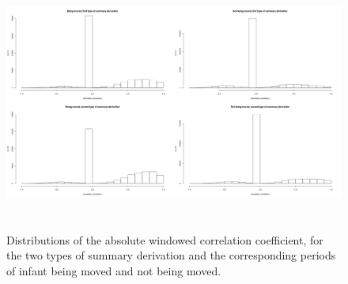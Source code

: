 \documentclass{article}
\begin{document}
{\begin{figure}[h!]
\includegraphics[width=15cm, height=8.5cm]{histogram_corr_coeff.png}
\caption{Distributions of the absolute windowed correlation coefficient, for the two types of summary derivation and the corresponding periods of infant being moved and not being moved.}
\end{figure}

}
\end{document}
